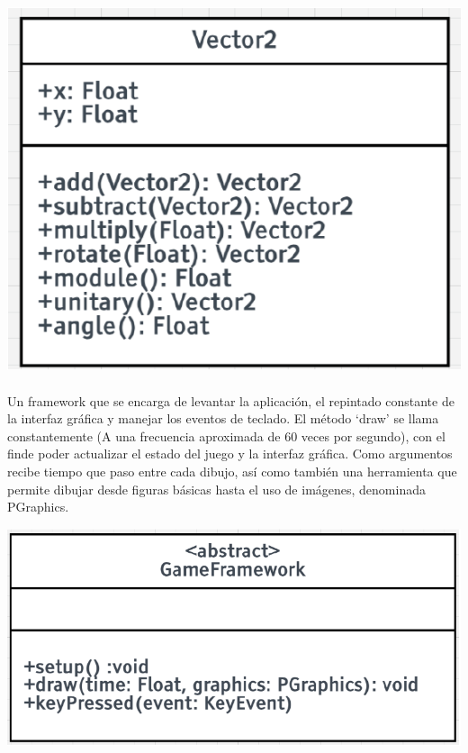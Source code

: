 \documentclass[a4paper,10pt]{extarticle}
\begin{document}
        \begin{center}
          \includegraphics[scale=0.55]{vector2.png}  
        \end{center}

        \paragraph{}
        Un framework que se encarga de levantar la aplicación, el repintado constante
        de la interfaz gráfica y manejar los eventos de teclado. El método ‘draw’ se
        llama constantemente (A una frecuencia aproximada de 60 veces por segundo),
        con el finde poder actualizar el estado del juego y la interfaz gráfica. Como
        argumentos recibe tiempo que paso entre cada dibujo, así como también una
        herramienta que permite dibujar desde figuras básicas hasta el uso de imágenes,
        denominada PGraphics.

        \begin{center}
          \includegraphics[scale=0.55]{game-framework.png}  
        \end{center}
\end{document}
